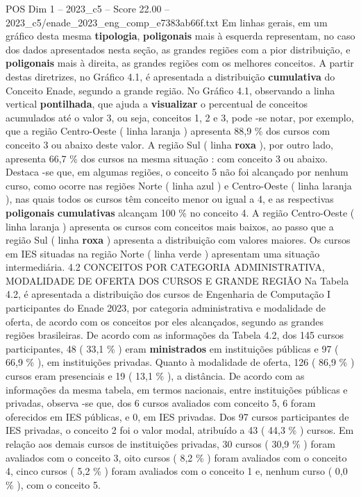 \begin{textsample}{POS Dim 1 – 2023\_c5 – Score 22.00 – 2023\_c5/enade\_2023\_eng\_comp\_e7383ab66f.txt}
Em linhas gerais, em um gráfico desta mesma \textbf{tipologia}, \textbf{poligonais} mais à esquerda representam, no caso dos dados apresentados nesta seção, as grandes regiões com a pior distribuição, e \textbf{poligonais} mais à direita, as grandes regiões com os melhores conceitos.
A partir destas diretrizes, no Gráfico 4.1, é apresentada a distribuição \textbf{cumulativa} do Conceito Enade, segundo a grande região.
No Gráfico 4.1, observando a linha vertical \textbf{pontilhada}, que ajuda a \textbf{visualizar} o percentual de conceitos acumulados até o valor 3, ou seja, conceitos 1, 2 e 3, pode -se notar, por exemplo, que a região Centro-Oeste ( linha laranja ) apresenta 88,9 \% dos cursos com conceito 3 ou abaixo deste valor.
A região Sul ( linha \textbf{roxa} ), por outro lado, apresenta 66,7 \% dos cursos na mesma situação : com conceito 3 ou abaixo.
Destaca -se que, em algumas regiões, o conceito 5 não foi alcançado por nenhum curso, como ocorre nas regiões Norte ( linha azul ) e Centro-Oeste ( linha laranja ), nas quais todos os cursos têm conceito menor ou igual a 4, e as respectivas \textbf{poligonais} \textbf{cumulativas} alcançam 100 \% no conceito 4.
A região Centro-Oeste ( linha laranja ) apresenta os cursos com conceitos mais baixos, ao passo que a região Sul ( linha \textbf{roxa} ) apresenta a distribuição com valores maiores.
Os cursos em IES situadas na região Norte ( linha verde ) apresentam uma situação intermediária. 4.2 CONCEITOS POR CATEGORIA ADMINISTRATIVA, MODALIDADE DE OFERTA DOS CURSOS E GRANDE REGIÃO Na Tabela 4.2, é apresentada a distribuição dos cursos de Engenharia de Computação I participantes do Enade 2023, por categoria administrativa e modalidade de oferta, de acordo com os conceitos por eles alcançados, segundo as grandes regiões brasileiras.
De acordo com as informações da Tabela 4.2, dos 145 cursos participantes, 48 ( 33,1 \% ) eram \textbf{ministrados} em instituições públicas e 97 ( 66,9 \% ), em instituições privadas.
Quanto à modalidade de oferta, 126 ( 86,9 \% ) cursos eram presenciais e 19 ( 13,1 \% ), a distância.
De acordo com as informações da mesma tabela, em termos nacionais, entre instituições públicas e privadas, observa -se que, dos 6 cursos avaliados com conceito 5, 6 foram oferecidos em IES públicas, e 0, em IES privadas.
Dos 97 cursos participantes de IES privadas, o conceito 2 foi o valor modal, atribuído a 43 ( 44,3 \% ) cursos.
Em relação aos demais cursos de instituições privadas, 30 cursos ( 30,9 \% ) foram avaliados com o conceito 3, oito cursos ( 8,2 \% ) foram avaliados com o conceito 4, cinco cursos ( 5,2 \% ) foram avaliados com o conceito 1 e, nenhum curso ( 0,0 \% ), com o conceito 5.

\end{textsample}
